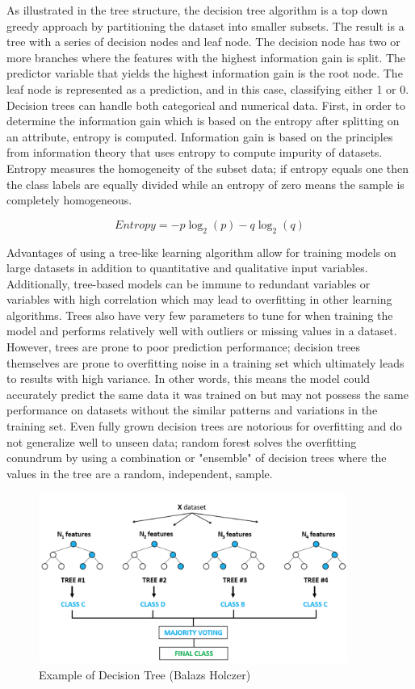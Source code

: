 \documentclass{llncs}
\begin{document}
As illustrated in the tree structure, the decision tree algorithm is a top down greedy approach by partitioning the dataset into smaller subsets. The result is a tree with a series of decision nodes and leaf node. The decision node has two or more branches where the features with the highest information gain is split. The predictor variable that yields the highest information gain is the root node. The leaf node is represented as a prediction, and in this case, classifying either 1 or 0. Decision trees can handle both categorical and numerical data. First, in order to determine the information gain which is based on the entropy after splitting on an attribute, entropy is computed. Information gain is based on the principles from information theory that uses entropy to compute impurity of datasets. Entropy measures the homogeneity of the subset data; if entropy equals one then the class labels are equally divided while an entropy of zero means the sample is completely homogeneous. 


\begin{equation}
Entropy = -p\log_{2}(p) - q\log_{2}(q)
\end{equation}


Advantages of using a tree-like learning algorithm allow for training models on large datasets in addition to quantitative and qualitative input variables. Additionally, tree-based models can be immune to redundant variables or variables with high correlation which may lead to overfitting in other learning algorithms. Trees also have very few parameters to tune for when training the model and performs relatively well with outliers or missing values in a dataset. However, trees are prone to poor prediction performance; decision trees themselves are prone to overfitting noise in a training set which ultimately leads to results with high variance. In other words, this means the model could accurately predict the same data it was trained on but may not possess the same performance on datasets without the similar patterns and variations in the training set. Even fully grown decision trees are notorious for overfitting and do not generalize well to unseen data; random forest solves the overfitting conundrum by using a combination or "ensemble" of decision trees where the values in the tree are a random, independent, sample. 


\begin{figure}
\centering
\includegraphics[width=0.90\textwidth]{randomforest.png}
\caption{Example of Decision Tree (Balazs Holczer)}
\end{figure}
\end{document}
